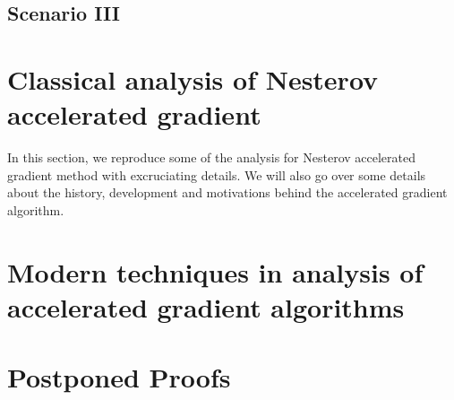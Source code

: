 \documentclass[12pt]{article}
\begin{document}
    \subsection{Scenario III}
    


\section{Classical analysis of Nesterov accelerated gradient}
    In this section, we reproduce some of the analysis for Nesterov accelerated gradient method with excruciating details. 
    We will also go over some details about the history, development and motivations behind the accelerated gradient algorithm. 

\section{Modern techniques in analysis of accelerated gradient algorithms}
    

\printbibliography

\appendix
\section*{Postponed Proofs}
    
\end{document}
